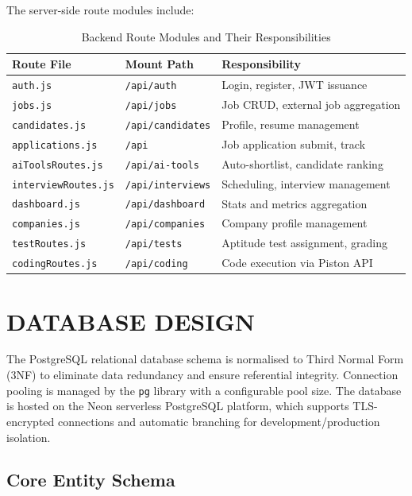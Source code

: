 \documentclass[12pt,a4paper]{report}
\begin{document}
The server-side route modules include:
\begin{table}[H]
    \centering
    \caption{Backend Route Modules and Their Responsibilities}
    \label{tab:routes}
    \begin{tabular}{|l|l|p{6cm}|}
        \hline
        \textbf{Route File} & \textbf{Mount Path} & \textbf{Responsibility} \\
        \hline
        \texttt{auth.js} & \texttt{/api/auth} & Login, register, JWT issuance \\
        \texttt{jobs.js} & \texttt{/api/jobs} & Job CRUD, external job aggregation \\
        \texttt{candidates.js} & \texttt{/api/candidates} & Profile, resume management \\
        \texttt{applications.js} & \texttt{/api} & Job application submit, track \\
        \texttt{aiToolsRoutes.js} & \texttt{/api/ai-tools} & Auto-shortlist, candidate ranking \\
        \texttt{interviewRoutes.js} & \texttt{/api/interviews} & Scheduling, interview management \\
        \texttt{dashboard.js} & \texttt{/api/dashboard} & Stats and metrics aggregation \\
        \texttt{companies.js} & \texttt{/api/companies} & Company profile management \\
        \texttt{testRoutes.js} & \texttt{/api/tests} & Aptitude test assignment, grading \\
        \texttt{codingRoutes.js} & \texttt{/api/coding} & Code execution via Piston API \\
        \hline
    \end{tabular}
\end{table}

\section{DATABASE DESIGN}

The PostgreSQL relational database schema is normalised to Third Normal Form (3NF) to eliminate data redundancy and ensure referential integrity. Connection pooling is managed by the \texttt{pg} library with a configurable pool size. The database is hosted on the Neon serverless PostgreSQL platform, which supports TLS-encrypted connections and automatic branching for development/production isolation.

\subsection{Core Entity Schema}
\end{document}

